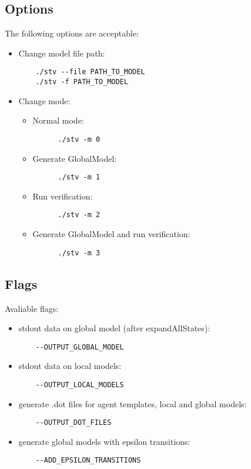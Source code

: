 \documentclass[12pt]{article}
\begin{document}
\subsection{Options}
The following options are acceptable:
\begin{itemize}
  \item Change model file path:
  \begin{lstlisting}
    ./stv --file PATH_TO_MODEL 
    ./stv -f PATH_TO_MODEL 
  \end{lstlisting}
  \item Change mode:
  \begin{itemize}
    \item Normal mode:
    \begin{lstlisting}
      ./stv -m 0
    \end{lstlisting}
    \item Generate GlobalModel:
    \begin{lstlisting}
      ./stv -m 1
    \end{lstlisting}
    \item Run verification:
    \begin{lstlisting}
      ./stv -m 2
    \end{lstlisting}
    \item Generate GlobalModel and run verification:
    \begin{lstlisting}
      ./stv -m 3
    \end{lstlisting}
  \end{itemize}
\end{itemize}

\subsection{Flags}
Avaliable flags:
\begin{itemize}
  \item stdout data on global model (after expandAllStates):
  \begin{lstlisting}
    --OUTPUT_GLOBAL_MODEL
  \end{lstlisting}
  \item stdout data on local models:
  \begin{lstlisting}
    --OUTPUT_LOCAL_MODELS
  \end{lstlisting}
  \item generate .dot files for agent templates, local and global models:
  \begin{lstlisting}
    --OUTPUT_DOT_FILES 
  \end{lstlisting}
  \item generate global models with epsilon transitions:
  \begin{lstlisting}
    --ADD_EPSILON_TRANSITIONS
  \end{lstlisting}
\end{itemize}
\end{document}
